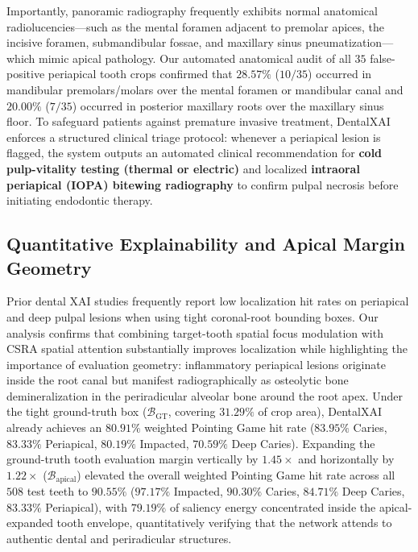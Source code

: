\documentclass[review]{elsarticle}
\begin{document}
Importantly, panoramic radiography frequently exhibits normal anatomical radiolucencies---such as the mental foramen adjacent to premolar apices, the incisive foramen, submandibular fossae, and maxillary sinus pneumatization---which mimic apical pathology. Our automated anatomical audit of all $35$ false-positive periapical tooth crops confirmed that $28.57\%$ ($10/35$) occurred in mandibular premolars/molars over the mental foramen or mandibular canal and $20.00\%$ ($7/35$) occurred in posterior maxillary roots over the maxillary sinus floor. To safeguard patients against premature invasive treatment, DentalXAI enforces a structured clinical triage protocol: whenever a periapical lesion is flagged, the system outputs an automated clinical recommendation for \textbf{cold pulp-vitality testing (thermal or electric)} and localized \textbf{intraoral periapical (IOPA) bitewing radiography} to confirm pulpal necrosis before initiating endodontic therapy.

\subsection{Quantitative Explainability and Apical Margin Geometry}
Prior dental XAI studies frequently report low localization hit rates on periapical and deep pulpal lesions when using tight coronal-root bounding boxes. Our analysis confirms that combining target-tooth spatial focus modulation with CSRA spatial attention substantially improves localization while highlighting the importance of evaluation geometry: inflammatory periapical lesions originate inside the root canal but manifest radiographically as osteolytic bone demineralization in the periradicular alveolar bone around the root apex. Under the tight ground-truth box ($\mathcal{B}_{\text{GT}}$, covering $31.29\%$ of crop area), DentalXAI already achieves an $80.91\%$ weighted Pointing Game hit rate ($83.95\%$ Caries, $83.33\%$ Periapical, $80.19\%$ Impacted, $70.59\%$ Deep Caries). Expanding the ground-truth tooth evaluation margin vertically by $1.45\times$ and horizontally by $1.22\times$ ($\mathcal{B}_{\text{apical}}$) elevated the overall weighted Pointing Game hit rate across all $508$ test teeth to $90.55\%$ ($97.17\%$ Impacted, $90.30\%$ Caries, $84.71\%$ Deep Caries, $83.33\%$ Periapical), with $79.19\%$ of saliency energy concentrated inside the apical-expanded tooth envelope, quantitatively verifying that the network attends to authentic dental and periradicular structures.
\end{document}
